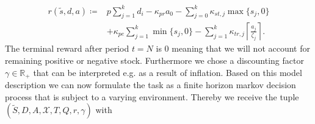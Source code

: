 \documentclass[journal, a4paper]{IEEEtran}
\theoremstyle{plain}
\theoremstyle{definition}
\begin{document}
\begin{equation}
\label{eq:one_step_reward}
	\begin{split}
		r(\tilde{s}, d, a) \coloneqq &p \sum_{j=1}^{k}d_i - \kappa_{pr} a_0 - \sum_{j=0}^{k} \kappa_{st, j} \max\{s_j, 0\} \\ 
		&+\kappa_{pe} \sum_{j=1}^{k}\min\{s_j, 0\} - \sum_{j=1}^{k} \kappa_{tr, j} \left\lceil \frac{a_j}{\zeta_j} \right\rceil.
	\end{split}
\end{equation}
The terminal reward after period $t=N$ is $0$ meaning that we will not account for remaining positive or negative stock. Furthermore we chose a discounting factor $\gamma \in \mathbb{R}_+$ that can be interpreted e.g. as a result of inflation. \newline Based on this model description we can now formulate the task as a finite horizon markov decision process that is subject to a varying environment. Thereby we receive the tuple $(\tilde{S}, D, A, \mathcal{X}, T, Q, r, \gamma)$ with
\end{document}

